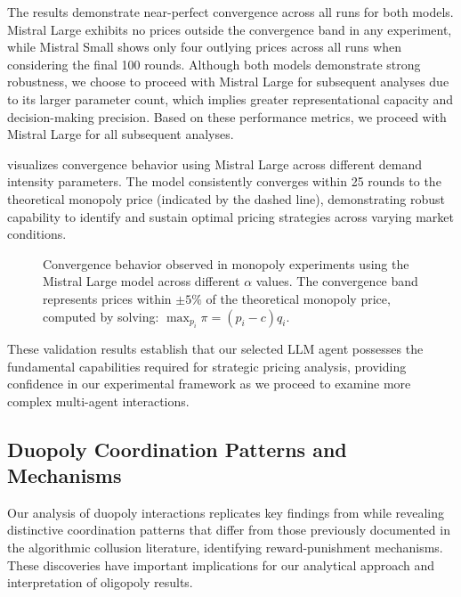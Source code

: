 The results demonstrate near-perfect convergence across all runs for both models. Mistral Large exhibits no prices outside the convergence band in any experiment, while Mistral Small shows only four outlying prices across all runs when considering the final 100 rounds. Although both models demonstrate strong robustness, we choose to proceed with Mistral Large for subsequent analyses due to its larger parameter count, which implies greater representational capacity and decision-making precision. Based on these performance metrics, we proceed with Mistral Large for all subsequent analyses.

 visualizes convergence behavior using Mistral Large across different demand intensity parameters. The model consistently converges within 25 rounds to the theoretical monopoly price (indicated by the dashed line), demonstrating robust capability to identify and sustain optimal pricing strategies across varying market conditions.

\begin{figure}[htpb!]
    \centering
    
    \caption{Convergence behavior observed in monopoly experiments using the Mistral Large model across different $\alpha$ values. The convergence band represents prices within $\pm 5\%$ of the theoretical monopoly price, computed by solving: $\max_{p_i} \pi = (p_i - c) q_i$.}
    \label{fig:monopoly_convergence}
\end{figure}

These validation results establish that our selected LLM agent possesses the fundamental capabilities required for strategic pricing analysis, providing confidence in our experimental framework as we proceed to examine more complex multi-agent interactions.

\subsection{Duopoly Coordination Patterns and Mechanisms}

Our analysis of duopoly interactions replicates key findings from \textcite{fish_algorithmic_2025} while revealing distinctive coordination patterns that differ from those previously documented in the algorithmic collusion literature, identifying reward-punishment mechanisms. These discoveries have important implications for our analytical approach and interpretation of oligopoly results.

